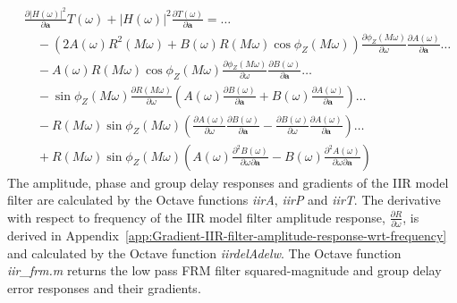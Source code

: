 \documentclass[a4paper,twoside,10pt,english]{report}
\begin{document}
\begin{align*}
&\frac{\partial\left|H\left(\omega\right)\right|^{2}}{\partial\boldsymbol{a}}
T\left(\omega\right)+\left|H\left(\omega\right)\right|^{2}
\frac{\partial T\left(\omega\right)}{\partial\boldsymbol{a}}=\hdots \\
& \quad -\left(2A\left(\omega\right)R^{2}\left(M\omega\right)
+B\left(\omega\right)R\left(M\omega\right)\cos\phi_{Z}\left(M\omega\right)\right)
\frac{\partial\phi_{Z}\left(M\omega\right)}{\partial\omega} 
\frac{\partial A\left(\omega\right)}{\partial\boldsymbol{a}} \hdots \\
& \quad -A\left(\omega\right)R\left(M\omega\right)
\cos\phi_{Z}\left(M\omega\right)
\frac{\partial\phi_{Z}\left(M\omega\right)}{\partial\omega} 
\frac{\partial B\left(\omega\right)}{\partial\boldsymbol{a}} \hdots \\
& \quad -\sin\phi_{Z}\left(M\omega\right)
\frac{\partial R\left(M\omega\right)}{\partial\omega} \left(
A\left(\omega\right)\frac{\partial B\left(\omega\right)}{\partial\boldsymbol{a}} 
+B\left(\omega\right)\frac{\partial A\left(\omega\right)}{\partial\boldsymbol{a}}
\right) \hdots \\
& \quad -R\left(M\omega\right)\sin\phi_{Z}\left(M\omega\right)\left(
\frac{\partial A\left(\omega\right)}{\partial\omega} 
\frac{\partial B\left(\omega\right)}{\partial\boldsymbol{a}}
-\frac{\partial B\left(\omega\right)}{\partial\omega} 
\frac{\partial A\left(\omega\right)}{\partial\boldsymbol{a}} \right)\hdots \\
& \quad +R\left(M\omega\right)\sin\phi_{Z}\left(M\omega\right)\left(
A\left(\omega\right)
\frac{\partial^{2} B\left(\omega\right)}{\partial\omega\partial\boldsymbol{a}} 
-B\left(\omega\right)
\frac{\partial^{2} A\left(\omega\right)}{\partial\omega\partial\boldsymbol{a}}
\right)
\end{align*}
The amplitude, phase and group delay responses and gradients of the IIR model 
filter are calculated by the Octave functions \emph{iirA}, \emph{iirP} and
\emph{iirT}. The derivative with respect to frequency of the IIR model filter
amplitude response, $\frac{\partial R}{\partial\omega}$, is derived in
Appendix~\ref{app:Gradient-IIR-filter-amplitude-response-wrt-frequency} 
and calculated by the Octave function \emph{iirdelAdelw}. The Octave function
\emph{iir\_frm.m} returns the low pass FRM filter squared-magnitude and
group delay error responses and their gradients. 
\end{document}
